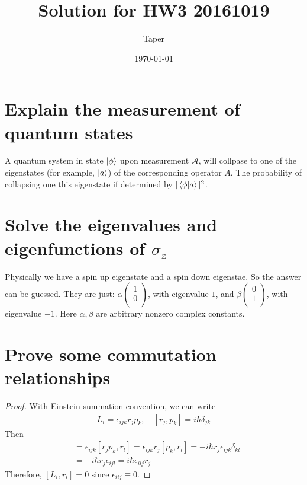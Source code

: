 \documentclass{article}
\title{Solution for HW3 20161019}
\date{\today}
\author{Taper}
\numberwithin{equation}{subsection} %
\theoremstyle{definition}
\begin{document}
\maketitle
{}
\section{Explain the measurement of quantum states}
A quantum system in state $\ket{\phi}$ upon measurement $\mathcal{A}$,
will collpase to one of the eigenstates (for example, $\ket{a}$) of the
corresponding operator $A$. The probability of collapsing one this
eigenstate if determined by $|\braket{\phi|a}|^2$.

\section{Solve the eigenvalues and eigenfunctions of
\texorpdfstring{$\sigma_z$}{}}

Physically we have a spin up eigenstate and a spin down eigenstae. So
the answer can be guessed. They are just:
$\alpha \left( \begin{array}{c}
 1 \\
 0 \\
\end{array} \right)$, with eigenvalue $1$, and
$\beta \left( \begin{array}{c}
 0 \\
 1 \\
\end{array} \right)$, with eigenvalue $-1$. Here $\alpha,\beta$ are
arbitrary nonzero complex constants.

\section{Prove some commutation relationships}
\begin{proof}
    With Einstein summation convention, we can write
\begin{align}
    L_i = \epsilon_{ijk} r_j p_k,\quad [r_j,p_k]= i\hbar\delta_{jk}
\end{align}
    Then
\begin{align}
    [L_i,r_l] &= \epsilon_{ijk} [r_j p_k,r_l] = \epsilon_{ijk}
    r_j[p_k,r_l] = -i\hbar r_j \epsilon_{ijk} \delta_{kl} \nonumber\\
    &= -i\hbar r_j \epsilon_{ijl} = i\hbar\epsilon_{ilj} r_j
\end{align}
Therefore, $[L_i,r_i] = 0$ since $\epsilon_{iij}\equiv 0$.
\end{proof}
\end{document}
